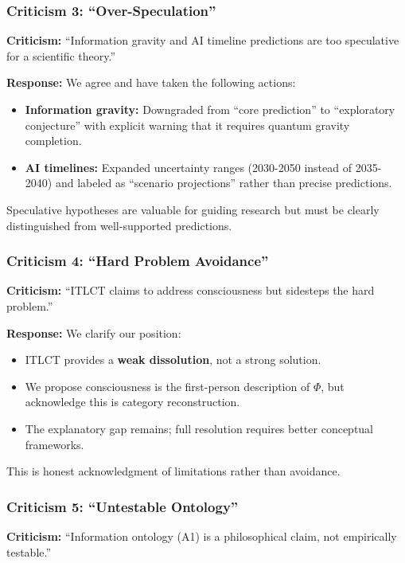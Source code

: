 \documentclass[12pt,a4paper]{article}
\begin{document}
\subsubsection{Criticism 3: ``Over-Speculation''}

\textbf{Criticism:} ``Information gravity and AI timeline predictions are too speculative for a scientific theory.''

\textbf{Response:} We agree and have taken the following actions:
\begin{itemize}
\item \textbf{Information gravity:} Downgraded from ``core prediction'' to ``exploratory conjecture'' with explicit warning that it requires quantum gravity completion.
\item \textbf{AI timelines:} Expanded uncertainty ranges (2030-2050 instead of 2035-2040) and labeled as ``scenario projections'' rather than precise predictions.
\end{itemize}
Speculative hypotheses are valuable for guiding research but must be clearly distinguished from well-supported predictions.

\subsubsection{Criticism 4: ``Hard Problem Avoidance''}

\textbf{Criticism:} ``ITLCT claims to address consciousness but sidesteps the hard problem.''

\textbf{Response:} We clarify our position:
\begin{itemize}
\item ITLCT provides a \textbf{weak dissolution}, not a strong solution.
\item We propose consciousness is the first-person description of $\Phi$, but acknowledge this is category reconstruction.
\item The explanatory gap remains; full resolution requires better conceptual frameworks.
\end{itemize}
This is honest acknowledgment of limitations rather than avoidance.

\subsubsection{Criticism 5: ``Untestable Ontology''}

\textbf{Criticism:} ``Information ontology (A1) is a philosophical claim, not empirically testable.''
\end{document}
